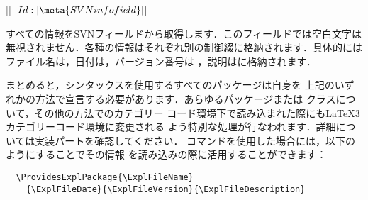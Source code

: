 \documentclass[uplatex,dvipdfmx,full,kernel]{wtpl3doc}
\begin{document}
\begin{documentation}
\begin{function}[updated = 2012-06-04]{\GetIdInfo}
  \begin{syntax}
    |\RequirePackage{l3bootstrap}|
     |$Id:| \meta{SVN info field} |$| 
  \end{syntax}
  すべての情報をSVNフィールドから取得します．このフィールドでは空白文字は
  無視されません．各種の情報はそれぞれ別の制御綴に格納されます．具体的には
  ファイル名は，日付は，バージョン番号は
  ，説明はに格納されます．
\end{function}

まとめると，シンタックスを使用するすべてのパッケージは自身を
上記のいずれかの方法で宣言する必要があります．あらゆるパッケージまたは
クラスについて，その他の方法で\LaTeXe のカテゴリー
コード環境下で読み込まれた際にも\LaTeX3カテゴリーコード環境に変更される
よう特別な処理が行なわれます．詳細については実装パートを確認してください．
コマンドを使用した場合には，以下のようにすることでその情報
を読み込みの際に活用することができます：
%
\begin{verbatim}
  \ProvidesExplPackage{\ExplFileName}
    {\ExplFileDate}{\ExplFileVersion}{\ExplFileDescription}
\end{verbatim}

\end{documentation}
\end{document}
